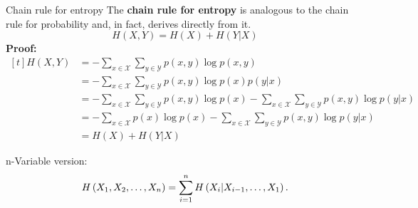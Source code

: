 \begin{vbframe} {Chain rule for entropy}
The \textbf{chain rule for entropy} is analogous to the chain rule for probability and, in fact, derives directly from it.
$$H(X, Y)=H(X)+H(Y | X)$$
\footnotesize
\textbf{Proof:}
$\begin{aligned}[t]
H(X, Y) &=-\sum_{x \in \mathcal{X}} \sum_{y \in \mathcal{Y}} p(x, y) \log p(x, y) \\
&=-\sum_{x \in \mathcal{X}} \sum_{y \in \mathcal{Y}} p(x, y) \log p(x) p(y | x) \\
&=-\sum_{x \in \mathcal{X}} \sum_{y \in \mathcal{Y}} p(x, y) \log p(x)-\sum_{x \in \mathcal{X}} \sum_{y \in \mathcal{Y}} p(x, y) \log p(y | x) \\
&=-\sum_{x \in \mathcal{X}} p(x) \log p(x)-\sum_{x \in \mathcal{X}} \sum_{y \in \mathcal{Y}} p(x, y) \log p(y | x) \\
&=H(X)+H(Y | X)
\end{aligned}
$
\normalsize

\lz

n-Variable version:
$$H\left(X_{1}, X_{2}, \ldots, X_{n}\right)=\sum_{i=1}^n H\left(X_{i} | X_{i-1}, \ldots, X_{1}\right).$$





\end{vbframe}
